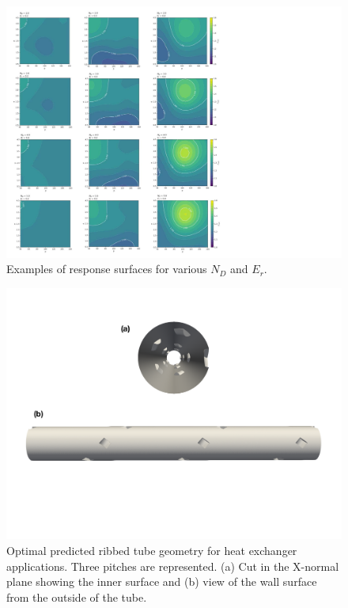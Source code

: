 \begin{figure}[h!]
\centering
\includegraphics[width=\linewidth,keepaspectratio]{fig/applications/optim/GP_discontinu_red.pdf}
\caption{Examples of response surfaces for various $N_D$ and $E_r$.}
\label{total_RS}
\end{figure}

\begin{figure}[!ht]
\centering
\includegraphics[width=0.8\linewidth,keepaspectratio]{fig/applications/optim/geom_opt.pdf}
\caption{Optimal predicted ribbed tube geometry for heat exchanger applications. Three pitches are represented. (a) Cut in the X-normal plane showing the inner surface and (b) view of the wall surface from the outside of the tube.}
\label{geom_optim}
\end{figure}

